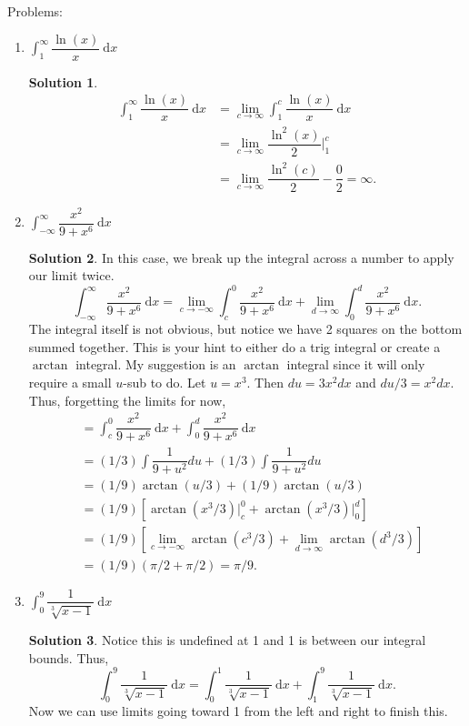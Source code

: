 \documentclass[10pt]{article}
\newcommand{\ds}{\displaystyle}
\newcommand{\dx}{\:\mathrm{d}x}
\theoremstyle{Theorem}
\theoremstyle{definition}
\newtheorem*{solution}{Solution}
\theoremstyle{remark}
\theoremstyle{custom}
\begin{document}
\newpage
Problems:
\begin{enumerate}[1.]
\item $\ds\int_1^{\infty}\dfrac{\ln(x)}{x}\dx$
\begin{solution}
\begin{align*}
\ds\int_1^{\infty}\dfrac{\ln(x)}{x}\dx&=\lim_{c\rightarrow \infty}\int_1^c\dfrac{\ln(x)}{x}\dx\\[2pt]
&=\lim_{c\rightarrow \infty} \dfrac{\ln^2(x)}{2}\Bigg|^c_1\\[2pt]
&=\lim_{c\rightarrow \infty} \dfrac{\ln^2(c)}{2}-\dfrac{0}{2}=\infty.
\end{align*}
\end{solution}
\item $\ds\int_{-\infty}^{\infty}\dfrac{x^2}{9+x^6}\dx$
\begin{solution}
In this case, we break up the integral across a number to apply our limit twice.
\[
\ds\int_{-\infty}^{\infty}\dfrac{x^2}{9+x^6}\dx=\lim_{c \rightarrow -\infty}\int_c^0 \dfrac{x^2}{9+x^6}\dx+\lim_{d\rightarrow \infty}\int_0^d \dfrac{x^2}{9+x^6}\dx.
\]
The integral itself is not obvious, but notice we have 2 squares on the bottom summed together. This is your hint to either do a trig integral or create a $\arctan$ integral. My suggestion is an $\arctan$ integral since it will only require a small $u$-sub to do. Let $u=x^3$. Then $du=3x^2dx$ and $du/3=x^2dx$. Thus, forgetting the limits for now,
\begin{align*}
&=\int_c^0 \dfrac{x^2}{9+x^6}\dx + \int_0^d \dfrac{x^2}{9+x^6}\dx\\[2pt]
&=(1/3)\int \dfrac{1}{9+u^2}du+ (1/3)\int \dfrac{1}{9+u^2}du\\[2pt]
&=(1/9)\arctan(u/3)+(1/9)\arctan(u/3)\\[2pt]
&=(1/9)\left[\arctan(x^3/3)\Bigg|^0_c+\arctan(x^3/3)\Bigg|^d_0\right]\\[2pt]
&=(1/9)\left[\lim_{c\rightarrow - \infty}\arctan(c^3/3)+\lim_{d\rightarrow \infty}\arctan(d^3/3)\right]\\[2pt]
&=(1/9)(\pi/2+\pi/2)=\pi/9.
\end{align*}
\end{solution}
\item $\ds\int_0^9 \dfrac{1}{\sqrt[3]{x-1}}\dx$
\begin{solution}
Notice this is undefined at 1 and 1 is between our integral bounds. Thus, 
\[
\ds\int_0^9 \dfrac{1}{\sqrt[3]{x-1}}\dx=\int_0^1\dfrac{1}{\sqrt[3]{x-1}}\dx+\int_1^9\dfrac{1}{\sqrt[3]{x-1}}\dx.
\]
Now we can use limits going toward 1 from the left and right to finish this.

\end{solution}
\end{enumerate}
\end{document}
